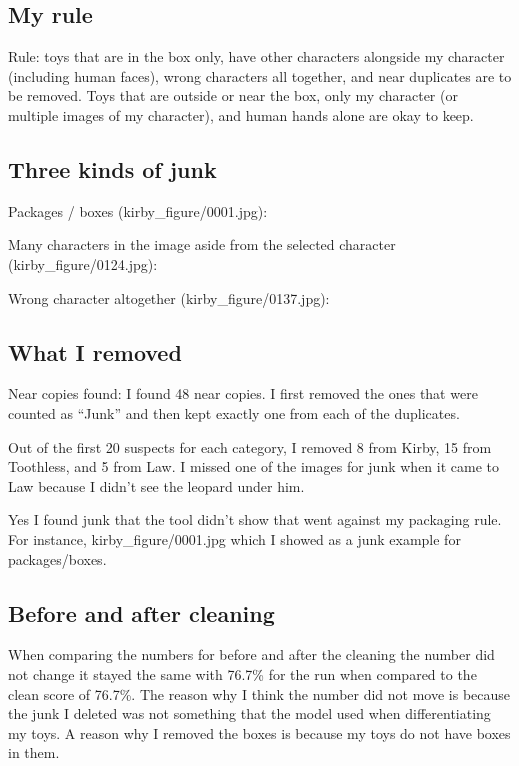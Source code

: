 \documentclass[11pt]{article}
\begin{document}
\subsection*{My rule}
Rule: toys that are in the box only, have other characters alongside my
character (including human faces), wrong characters all together, and near
duplicates are to be removed. Toys that are outside or near the box, only my
character (or multiple images of my character), and human hands alone are okay
to keep.

\subsection*{Three kinds of junk}
Packages / boxes (kirby\_figure/0001.jpg):

Many characters in the image aside from the selected character
(kirby\_figure/0124.jpg):

Wrong character altogether (kirby\_figure/0137.jpg):

\subsection*{What I removed}

Near copies found: I found 48 near copies. I first removed the ones that were
counted as ``Junk'' and then kept exactly one from each of the duplicates.

Out of the first 20 suspects for each category, I removed 8 from Kirby, 15
from Toothless, and 5 from Law. I missed one of the images for junk when it
came to Law because I didn't see the leopard under him.


Yes I found junk that the tool didn't show that went against my packaging rule.
For instance, kirby\_figure/0001.jpg which I showed as a junk example for
packages/boxes.

\subsection*{Before and after cleaning}

When comparing the numbers for before and after the cleaning the number did
not change it stayed the same with 76.7\% for the run when compared to the
clean score of 76.7\%. The reason why I think the number did not move is
because the junk I deleted was not something that the model used when
differentiating my toys. A reason why I removed the boxes is because my toys do
not have boxes in them.
\end{document}
